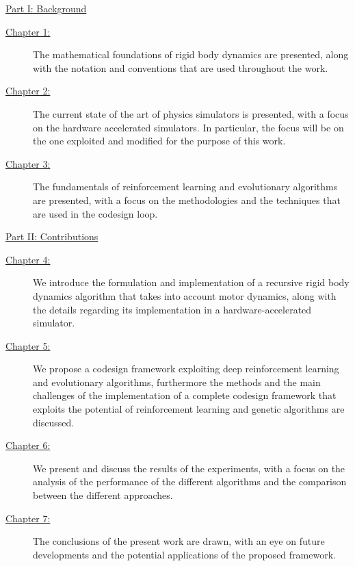 \begin{description}

    \item{\hyperref[part:background]{Part I: Background}}

          \begin{description}
              \item[{\hyperref[chp:back_RBDynamics]{Chapter 1:}}] The mathematical foundations of rigid body dynamics are presented, along with the notation and conventions that are used throughout the work.
              \item[{\hyperref[chp:back_PhysicsSimulators]{Chapter 2:}}] The current state of the art of physics simulators is presented, with a focus on the hardware accelerated simulators. In particular, the focus will be on the one exploited and modified for the purpose of this work.
              \item [{\hyperref[chp:back_RLGA]{Chapter 3:}}] The fundamentals of reinforcement learning and evolutionary algorithms are presented, with a focus on the methodologies and the techniques that are used in the codesign loop.
          \end{description}

    \item{\hyperref[part:contributions]{Part II: Contributions}}

          \begin{description}
              \item[{\hyperref[chp:contrib_ABA]{Chapter 4:}}] We introduce the formulation and implementation of a recursive rigid body dynamics algorithm that takes into account motor dynamics, along with the details regarding its implementation in a hardware-accelerated simulator.
              \item[{\hyperref[chp:contrib_CodesignRL]{Chapter 5:}}] We propose a codesign framework exploiting deep reinforcement learning and evolutionary algorithms, furthermore the methods and the main challenges of the implementation of a complete codesign framework that exploits the potential of reinforcement learning and genetic algorithms are discussed.
              \item[{\hyperref[chp:contrib_ResultsDiscussion]{Chapter 6:}}] We present and discuss the results of the experiments, with a focus on the analysis of the performance of the different algorithms and the comparison between the different approaches.
              \item[{\hyperref[chp:contrib_Conclusions]{Chapter 7:}}] The conclusions of the present work are drawn, with an eye on future developments and the potential applications of the proposed framework.
          \end{description}
\end{description}

